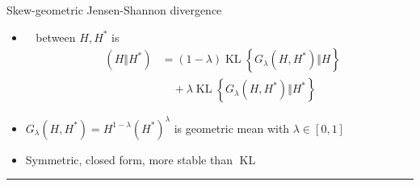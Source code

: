 \documentclass[14pt,aspectratio=169]{beamer}
\DeclareMathOperator{\KL}{KL}
\newcommand{\JSGa}{\mathop{\mathrm{JS}^{\mathrm{G}_{\lambda}}}\nolimits}
\begin{document}
\begin{frame}{Skew-geometric Jensen-Shannon divergence}
\begin{itemize}%
  \item $\JSGa{}$ between $H, H^*$ is
  \begin{align*}
  \JSGa{(H \Vert H^*)} 
      &= (1- \lambda) \KL{\left\{G_{\lambda}(H, H^*) \Vert H\right\}} \\
      &\quad + \lambda \KL{\left\{G_{\lambda}(H, H^*) \Vert H^*\right\}}
  \end{align*}
\item <2-> $G_{\lambda}(H, H^*) = H^{1-\lambda}(H^*)^{\lambda}$ is geometric mean with $\lambda \in [0, 1]$
    \item <3-> Symmetric, closed form, more stable than $\KL{}$
  \end{itemize}
\vspace{1.3cm}
  {\scriptsize
    \rule{\linewidth}{0.4pt}\\
  }
\end{frame}
\end{document}
